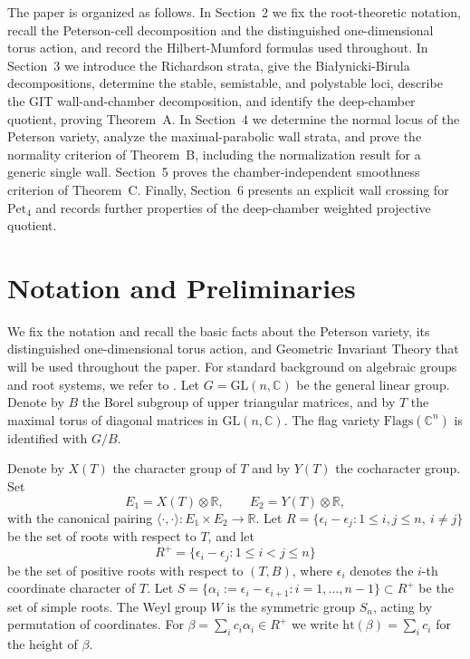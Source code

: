 \documentclass[12pt, reqno]{amsart}
\theoremstyle{plain}
\numberwithin{equation}{section}
\theoremstyle{definition}
\begin{document}
The paper is organized as follows. In Section~2 we fix the
root-theoretic notation, recall the Peterson-cell decomposition and
the distinguished one-dimensional torus action, and record the
Hilbert-Mumford formulas used throughout. In Section~3 we introduce
the Richardson strata, give the Bia{\l}ynicki-Birula decompositions, determine the stable, semistable, and
polystable loci, describe the GIT wall-and-chamber decomposition, and
identify the deep-chamber quotient, proving Theorem~A. In Section~4 we
determine the normal locus of the Peterson variety, analyze the
maximal-parabolic wall strata, and prove the normality criterion of
Theorem~B, including the normalization result for a generic single
wall. Section~5 proves the chamber-independent smoothness criterion of
Theorem~C. Finally, Section~6 presents an explicit wall crossing for
\(\mathrm{Pet}_4\) and records further properties of the
deep-chamber weighted projective quotient.


\section{Notation and Preliminaries}

We fix the notation and recall the basic facts about the Peterson
variety, its distinguished one-dimensional torus action, and
Geometric Invariant Theory that will be used throughout the paper.
For standard background on algebraic groups and root systems, we
refer to \cite{Hum,Hum2,Spr}.
Let $G = \mathrm{GL}(n,\mathbb{C})$ be the general linear group. Denote by $B$ the Borel subgroup of upper triangular matrices, and by $T$ the maximal torus of diagonal matrices in \(\mathrm{GL}(n,\mathbb{C})\). The flag variety $\mathrm{Flags}(\mathbb{C}^n)$ is identified with $G/B$.

Denote by \(X(T)\) the character group of \(T\) and by \(Y(T)\) the cocharacter group. Set
\[
E_1 = X(T) \otimes \mathbb{R}, \qquad E_2 = Y(T) \otimes \mathbb{R},
\]
with the canonical pairing \(\langle \cdot,\cdot \rangle : E_1 \times E_2 \to \mathbb{R}\). Let $R = \{\epsilon_i - \epsilon_j : 1 \le i, j \le n,\ i \neq j\}$ be the set of roots with respect to $T$, and let
\[
R^+ = \{\epsilon_i - \epsilon_j : 1 \le i < j \le n\}
\]
be the set of positive roots with respect to $(T,B)$, where \(\epsilon_i\) denotes the \(i\)-th coordinate character of \(T\).
Let $S = \{\alpha_i := \epsilon_i - \epsilon_{i+1} : i = 1,\dots,n-1\} \subset R^+$ be the set of simple roots.
The Weyl group $W$ is the symmetric group $S_n$, acting by permutation of coordinates. For $\beta=\sum_{i}c_{i}\alpha_{i}\in R^{+}$ we write $\mathrm{ht}(\beta)=\sum_{i}c_{i}$ for the
height of $\beta$.
\end{document}
